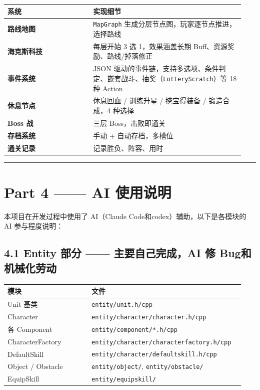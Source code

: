 \documentclass[UTF8,10pt]{ctexart}
\begin{document}
{\small
\begin{longtable}{p{0.34\linewidth}p{0.60\linewidth}}
\toprule
\textbf{系统} & \textbf{实现细节} \\
\midrule
\textbf{路线地图} & \texttt{MapGraph} 生成分层节点图，玩家逐节点推进，选择路线 \\
\textbf{海克斯科技} & 每层开始 3 选 1，效果涵盖长期 Buff、资源奖励、路线/掉落修正 \\
\textbf{事件系统} & JSON 驱动的事件链，支持多选项、条件判定、嵌套战斗、抽奖（\texttt{LotteryScratch}）等 18 种 Action \\
\textbf{休息节点} & 休息回血 / 训练升星 / 挖宝得装备 / 锻造合成，4 种选择 \\
\textbf{Boss 战} & 三层 Boss，击败即通关 \\
\textbf{存档系统} & 手动 + 自动存档，多槽位 \\
\textbf{通关记录} & 记录胜负、阵容、用时 \\
\bottomrule
\end{longtable}
}

\par\medskip\hrule\medskip

\section*{Part 4 —— AI 使用说明}

本项目在开发过程中使用了 AI（Claude Code和codex）辅助，以下是各模块的 AI 参与程度说明：

\subsection*{4.1 Entity 部分 —— 主要自己完成，AI 修 Bug和机械化劳动}

{\small
\begin{longtable}{p{0.34\linewidth}p{0.60\linewidth}}
\toprule
\textbf{模块} & \textbf{文件} \\
\midrule
Unit 基类 & \texttt{entity/\allowbreak{}unit.\allowbreak{}h/\allowbreak{}cpp} \\
Character & \texttt{entity/\allowbreak{}character/\allowbreak{}character.\allowbreak{}h/\allowbreak{}cpp} \\
各 Component & \texttt{entity/\allowbreak{}component/\allowbreak{}*.\allowbreak{}h/\allowbreak{}cpp} \\
CharacterFactory & \texttt{entity/\allowbreak{}character/\allowbreak{}characterfactory.\allowbreak{}h/\allowbreak{}cpp} \\
DefaultSkill & \texttt{entity/\allowbreak{}character/\allowbreak{}defaultskill.\allowbreak{}h/\allowbreak{}cpp} \\
Object / Obstacle & \texttt{entity/\allowbreak{}object/\allowbreak{}}, \texttt{entity/\allowbreak{}obstacle/\allowbreak{}} \\
EquipSkill & \texttt{entity/\allowbreak{}equipskill/\allowbreak{}} \\
\bottomrule
\end{longtable}
}
\end{document}
